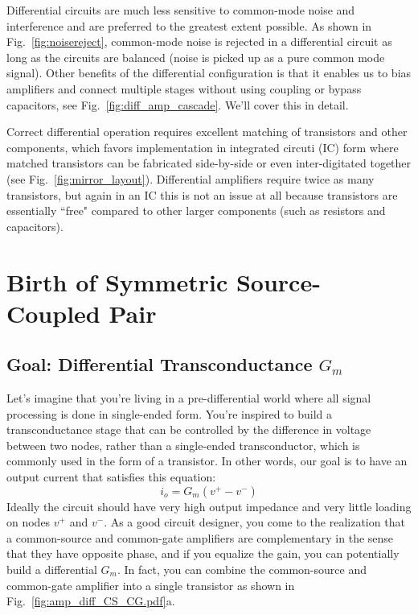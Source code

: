Differential circuits are much less sensitive to common-mode noise and interference and are preferred to the greatest extent possible.  As shown in Fig.~\ref{fig:noisereject}, common-mode noise is rejected in a differential circuit as long as the circuits are balanced (noise is picked up as a pure common mode signal).  Other benefits of the differential configuration is that it enables us to bias amplifiers and connect multiple stages without using coupling or bypass capacitors, see Fig.~\ref{fig:diff_amp_cascade}.  We'll cover this in detail.  

Correct differential operation requires excellent matching of transistors and other components, which favors implementation in integrated circuti (IC) form where matched transistors can be fabricated side-by-side or even inter-digitated together (see Fig.~\ref{fig:mirror_layout}).  Differential amplifiers require twice as many transistors, but again in an IC this is not an issue at all because transistors are essentially ``free" compared to other larger components (such as resistors and capacitors).


\section{Birth of Symmetric Source-Coupled Pair}



\subsection{Goal:  Differential Transconductance $G_m$}

Let's imagine that you're living in a pre-differential world where all signal processing is done in single-ended form.  You're inspired to build a transconductance stage that can be controlled by the difference in voltage between two nodes, rather than a single-ended transconductor, which is commonly used in the form of a transistor.   In other words, our goal is to have an output current that satisfies this equation:
%
\begin{equation}
	i_o = G_m (v^+ - v^-)
\end{equation}
%
Ideally the circuit should have very high output impedance and very little loading on nodes $v^+$ and $v^-$.  As a good circuit designer, you come to the realization that a common-source and common-gate amplifiers are complementary in the sense that they have opposite phase, and if you equalize the gain, you can potentially build a differential $G_m$.  In fact, you can combine the common-source and common-gate amplifier into a single transistor as shown in Fig.~\ref{fig:amp_diff_CS_CG.pdf}a.  


